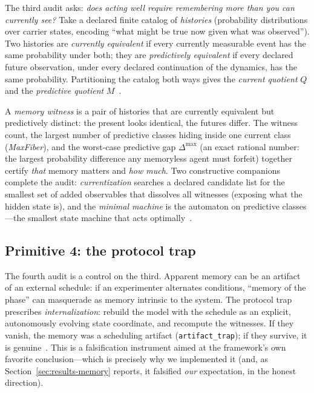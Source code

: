\documentclass[11pt]{article}
\theoremstyle{definition}
\begin{document}
The third audit asks: \emph{does acting well require remembering more than you can currently see?} Take a declared finite catalog of \emph{histories} (probability distributions over carrier states, encoding ``what might be true now given what was observed''). Two histories are \emph{currently equivalent} if every currently measurable event has the same probability under both; they are \emph{predictively equivalent} if every declared future observation, under every declared continuation of the dynamics, has the same probability. Partitioning the catalog both ways gives the \emph{current quotient} $Q$ and the \emph{predictive quotient} $M$~\cite{sbt-hol}.

A \emph{memory witness} is a pair of histories that are currently equivalent but predictively distinct: the present looks identical, the futures differ. The witness count, the largest number of predictive classes hiding inside one current class (\emph{MaxFiber}), and the worst-case predictive gap $\Delta^{\max}$ (an exact rational number: the largest probability difference any memoryless agent must forfeit) together certify \emph{that} memory matters and \emph{how much}. Two constructive companions complete the audit: \emph{currentization} searches a declared candidate list for the smallest set of added observables that dissolves all witnesses (exposing what the hidden state is), and the \emph{minimal machine} is the automaton on predictive classes---the smallest state machine that acts optimally~\cite{sbt-hol,sbt-hid}.

\subsection{Primitive 4: the protocol trap}
\label{sec:sbt-trap}

The fourth audit is a control on the third. Apparent memory can be an artifact of an external schedule: if an experimenter alternates conditions, ``memory of the phase'' can masquerade as memory intrinsic to the system. The protocol trap prescribes \emph{internalization}: rebuild the model with the schedule as an explicit, autonomously evolving state coordinate, and recompute the witnesses. If they vanish, the memory was a scheduling artifact (\texttt{artifact\_trap}); if they survive, it is genuine~\cite{sbt-pt,sbt-f1}. This is a falsification instrument aimed at the framework's own favorite conclusion---which is precisely why we implemented it (and, as Section~\ref{sec:results-memory} reports, it falsified \emph{our} expectation, in the honest direction).
\end{document}
